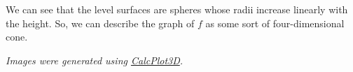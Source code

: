 \documentclass{ximera}
\begin{document}
\begin{example}
We can see that the level surfaces are spheres whose radii increase linearly with the height. So, we can describe the graph of $f$ as some sort of four-dimensional cone.

\end{example}

\textit{Images were generated using \href{https://www.monroecc.edu/faculty/paulseeburger/calcnsf/CalcPlot3D/}{CalcPlot3D}.}
\end{document}

